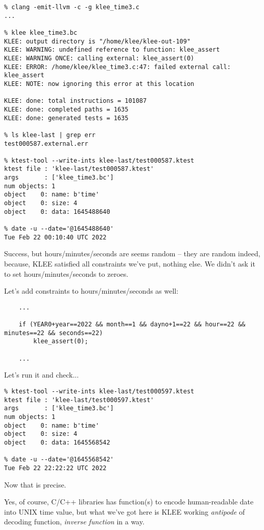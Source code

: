 

\begin{lstlisting}
% clang -emit-llvm -c -g klee_time3.c
...

% klee klee_time3.bc
KLEE: output directory is "/home/klee/klee-out-109"
KLEE: WARNING: undefined reference to function: klee_assert
KLEE: WARNING ONCE: calling external: klee_assert(0)
KLEE: ERROR: /home/klee/klee_time3.c:47: failed external call: klee_assert
KLEE: NOTE: now ignoring this error at this location

KLEE: done: total instructions = 101087
KLEE: done: completed paths = 1635
KLEE: done: generated tests = 1635

% ls klee-last | grep err
test000587.external.err

% ktest-tool --write-ints klee-last/test000587.ktest
ktest file : 'klee-last/test000587.ktest'
args       : ['klee_time3.bc']
num objects: 1
object    0: name: b'time'
object    0: size: 4
object    0: data: 1645488640

% date -u --date='@1645488640'
Tue Feb 22 00:10:40 UTC 2022
\end{lstlisting}

Success, but hours/minutes/seconds are seems random -- they are random indeed, because, KLEE satisfied all constraints we've put, nothing else.
We didn't ask it to set hours/minutes/seconds to zeroes.

Let's add constraints to hours/minutes/seconds as well:

\begin{lstlisting}
	...

	if (YEAR0+year==2022 && month==1 && dayno+1==22 && hour==22 && minutes==22 && seconds==22)
		klee_assert(0);
	
	...
\end{lstlisting}

Let's run it and check...

\begin{lstlisting}
% ktest-tool --write-ints klee-last/test000597.ktest
ktest file : 'klee-last/test000597.ktest'
args       : ['klee_time3.bc']
num objects: 1
object    0: name: b'time'
object    0: size: 4
object    0: data: 1645568542

% date -u --date='@1645568542'
Tue Feb 22 22:22:22 UTC 2022
\end{lstlisting}

Now that is precise.

Yes, of course, C/C++ libraries has function(s) to encode human-readable date into UNIX time value, but what we've got here is KLEE working
\textit{antipode} of decoding function, \textit{inverse function} in a way.

